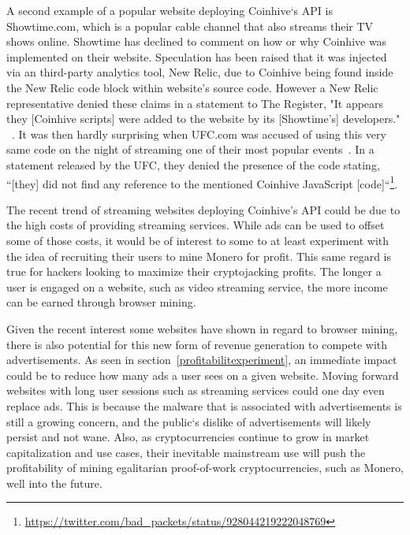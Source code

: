A second example of a popular website deploying Coinhive`s API is Showtime.com, which is a popular cable channel that also streams their TV shows online. Showtime has declined to comment on how or why Coinhive was implemented on their website. Speculation has been raised that it was injected via an third-party analytics tool, New Relic, due to Coinhive being found inside the New Relic code block within website's source code. However a New Relic representative denied these claims in a statement to The Register, "It appears they [Coinhive scripts] were added to the website by its [Showtime's] developers." ~\cite{registershowtime}. 
It was then hardly surprising when UFC.com was accused of using this very same code on the night of streaming one of their most popular events~\cite{registerufcmonero}. In a statement released by the UFC, they denied the presence of the code stating, ``[they] did not find any reference to the mentioned Coinhive JavaScript [code]``\footnote{\url{https://twitter.com/bad_packets/status/928044219222048769}}.
 
The recent trend of streaming websites deploying Coinhive's API could be due to the high costs of providing streaming services. While ads can be used to offset some of those costs, it would be of interest to some to at least experiment with the idea of recruiting their users to mine Monero for profit. This same regard is true for hackers looking to maximize their cryptojacking profits. The longer a user is engaged on a website, such as video streaming service, the more income can be earned through browser mining.

Given the recent interest some websites have shown in regard to browser mining, there is also potential for this new form of revenue generation to compete with advertisements. As seen in section~\ref{profitabilitexperiment}, an immediate impact could be to reduce how many ads a user sees on a given website. Moving forward websites with long user sessions such as streaming services could one day even replace ads. This is because the malware that is associated with advertisements is still a growing concern, and the public`s dislike of advertisements will likely persist and not wane. Also, as cryptocurrencies continue to grow in market capitalization and use cases, their inevitable mainstream use will push the profitability of mining egalitarian proof-of-work cryptocurrencies, such as Monero, well into the future. 

